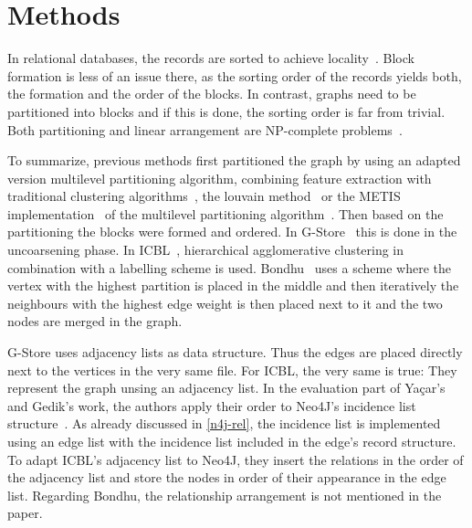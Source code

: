 \chapter{Methods}\label{\positionnumber}
    In relational databases, the records are sorted to achieve locality~\autocite{ramakrishnan2000database, silberschatz1997database}. 
    Block formation is less of an issue there, as the sorting order of the records yields both, the formation and the order of the blocks.
    In contrast, graphs need to be partitioned into blocks and if this is done, the sorting order is far from trivial.
    Both partitioning and linear arrangement are NP-complete problems~\autocite{lewis1983computers}.
    
     To summarize, previous methods first partitioned the graph by using an adapted version multilevel partitioning algorithm, combining feature extraction with traditional clustering algorithms~\autocite{overview_clust}, the louvain method~\autocite{blondel2008fast} or the METIS implementation~\autocite{karypis} of the multilevel partitioning algorithm~\autocite{hendrickson1995multi}.
    Then based on the partitioning the blocks were formed and ordered.
    In G-Store~\autocite{steinhaus2010g} this is done in the uncoarsening phase.
    In ICBL~\autocite{yacsar2017distributed, yacsar2015scalable}, hierarchical agglomerative clustering in combination with a labelling scheme is used.
    Bondhu~\autocite{hoque2012disk} uses a scheme where the vertex with the highest partition is placed in the middle and then iteratively the neighbours with the highest edge weight is then placed next to it and the two nodes are merged in the graph. 
    
    G-Store uses adjacency lists as data structure.
    Thus the edges are placed directly next to the vertices in the very same file.
    For ICBL, the very same is true:
    They represent the graph unsing an adjacency list. 
    In the evaluation part of Ya\c{c}ar's and Gedik's work, the authors apply their order to Neo4J's incidence list structure~\autocite{Rodriguez2010ConstructionsFD, robinson2015graph}. 
    As already discussed in \ref{n4j-rel}, the incidence list is implemented using an edge list with the incidence list included in the edge's record structure.
    To adapt ICBL's adjacency list to Neo4J, they insert the relations in the order of the adjacency list and store the nodes in order of their appearance in the edge list.    
    Regarding Bondhu, the relationship arrangement is not mentioned in the paper.
    
